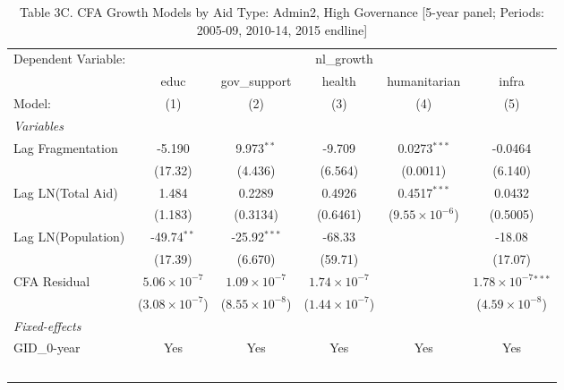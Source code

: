 \begin{table}[H]
   \caption{Table 3C. CFA Growth Models by Aid Type: Admin2, High Governance [5-year panel; Periods: 2005-09, 2010-14, 2015 endline]}
   \centering
   \begin{tabular}{lccccc}
      \tabularnewline \midrule \midrule
      Dependent Variable: & \multicolumn{5}{c}{nl\_growth}\\
                         & educ                    & gov\_support            & health                  & humanitarian            & infra \\   
      Model:             & (1)                     & (2)                     & (3)                     & (4)                     & (5)\\  
      \midrule
      \emph{Variables}\\
      Lag Fragmentation  & -5.190                  & 9.973$^{**}$            & -9.709                  & 0.0273$^{***}$          & -0.0464\\   
                         & (17.32)                 & (4.436)                 & (6.564)                 & (0.0011)                & (6.140)\\   
      Lag LN(Total Aid)  & 1.484                   & 0.2289                  & 0.4926                  & 0.4517$^{***}$          & 0.0432\\   
                         & (1.183)                 & (0.3134)                & (0.6461)                & ($9.55\times 10^{-6}$)  & (0.5005)\\   
      Lag LN(Population) & -49.74$^{**}$           & -25.92$^{***}$          & -68.33                  &                         & -18.08\\   
                         & (17.39)                 & (6.670)                 & (59.71)                 &                         & (17.07)\\   
      CFA Residual       & $5.06\times 10^{-7}$    & $1.09\times 10^{-7}$    & $1.74\times 10^{-7}$    &                         & $1.78\times 10^{-7}$$^{***}$\\    
                         & ($3.08\times 10^{-7}$)  & ($8.55\times 10^{-8}$)  & ($1.44\times 10^{-7}$)  &                         & ($4.59\times 10^{-8}$)\\    
      \midrule
      \emph{Fixed-effects}\\
      GID\_0-year        & Yes                     & Yes                     & Yes                     & Yes                     & Yes\\  
$$
\end{tabular}
\end{table}
